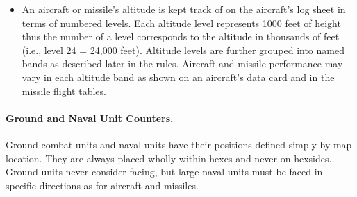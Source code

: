 \begin{itemize}

    \item {} An aircraft or missile's altitude is kept track of on the aircraft's log sheet in terms of numbered levels. Each altitude level represents 1000 feet of height thus the number of a level corresponds to the altitude in thousands of feet (i.e., level 24 = 24,000 feet). Altitude levels are further grouped into named bands as described later in the rules. Aircraft and missile performance may vary in each altitude band as shown on an aircraft's data card and in the missile flight tables.

\end{itemize}

\paragraph{Ground and Naval Unit Counters.} Ground combat units and naval units have their positions defined simply by map location. They are always placed wholly within hexes and never on hexsides. Ground units never consider facing, but large naval units must be faced in specific directions as for aircraft and missiles.

